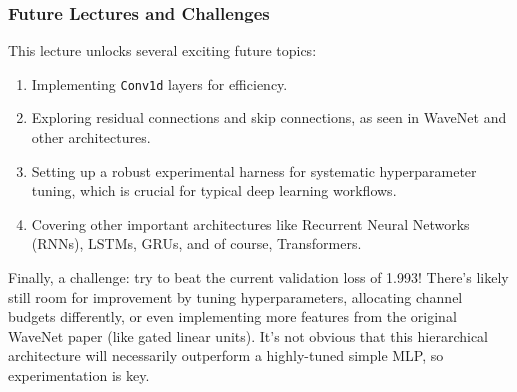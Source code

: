 \subsubsection{Future Lectures and Challenges}
This lecture unlocks several exciting future topics:
\begin{enumerate}
    \item Implementing \texttt{Conv1d} layers for efficiency.
    \item Exploring residual connections and skip connections, as seen in WaveNet and other architectures.
    \item Setting up a robust experimental harness for systematic hyperparameter tuning, which is crucial for typical deep learning workflows.
    \item Covering other important architectures like Recurrent Neural Networks (RNNs), LSTMs, GRUs, and of course, Transformers.
\end{enumerate}

Finally, a challenge: try to beat the current validation loss of 1.993! There's likely still room for improvement by tuning hyperparameters, allocating channel budgets differently, or even implementing more features from the original WaveNet paper (like gated linear units). It's not obvious that this hierarchical architecture will necessarily outperform a highly-tuned simple MLP, so experimentation is key.